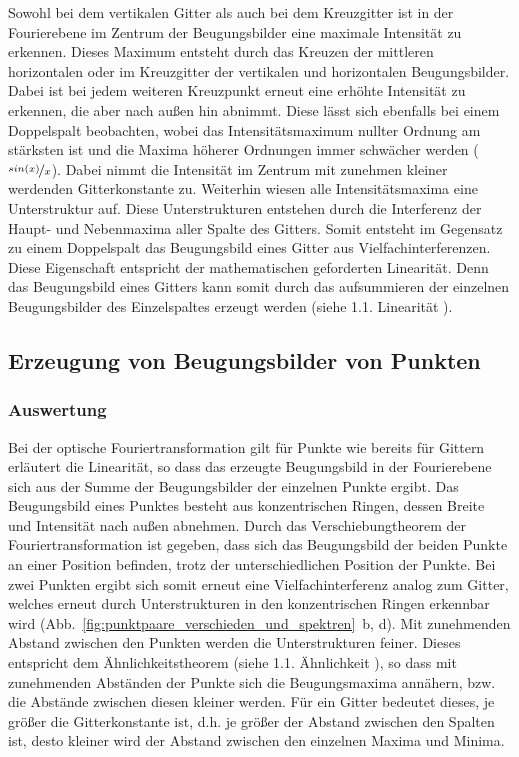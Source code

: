 Sowohl bei dem vertikalen Gitter als auch bei dem Kreuzgitter ist in der Fourierebene im Zentrum der Beugungsbilder eine maximale Intensität zu erkennen. Dieses Maximum entsteht durch das Kreuzen der mittleren horizontalen oder im Kreuzgitter der vertikalen und
horizontalen Beugungsbilder. Dabei ist bei jedem weiteren Kreuzpunkt erneut eine erhöhte Intensität zu erkennen, die aber nach außen hin abnimmt. Diese lässt sich ebenfalls bei einem
Doppelspalt beobachten, wobei das Intensitätsmaximum nullter Ordnung am stärksten ist und die Maxima höherer Ordnungen immer schwächer werden ($\nicefrac{sin(x)}{x}$). Dabei nimmt die Intensität im Zentrum mit zunehmen kleiner werdenden Gitterkonstante zu.
Weiterhin wiesen alle Intensitätsmaxima eine Unterstruktur auf. Diese Unterstrukturen entstehen durch die Interferenz der Haupt- und Nebenmaxima aller Spalte des Gitters. Somit entsteht im Gegensatz zu einem Doppelspalt das Beugungsbild eines Gitter aus Vielfachinterferenzen. Diese Eigenschaft entspricht der mathematischen geforderten Linearität. Denn das Beugungsbild eines Gitters kann somit durch das aufsummieren der einzelnen Beugungsbilder des Einzelspaltes erzeugt werden (siehe 1.1. Linearität%
).


\subsection{Erzeugung von Beugungsbilder von Punkten}
\subsubsection*{Auswertung}

Bei der optische Fouriertransformation gilt für Punkte wie bereits für Gittern erläutert die Linearität, so dass das erzeugte Beugungsbild in der Fourierebene sich aus der Summe der Beugungsbilder der einzelnen Punkte ergibt. Das Beugungsbild eines Punktes besteht aus konzentrischen Ringen, dessen Breite und Intensität nach außen abnehmen. Durch das Verschiebungtheorem der Fouriertransformation ist gegeben, dass sich das Beugungsbild der beiden Punkte an einer Position befinden, trotz der unterschiedlichen Position der Punkte. Bei zwei Punkten ergibt sich somit erneut eine Vielfachinterferenz analog zum Gitter, welches erneut durch Unterstrukturen in den konzentrischen Ringen erkennbar wird (Abb.~\ref{fig:punktpaare_verschieden_und_spektren}~b, d). Mit zunehmenden Abstand zwischen den Punkten werden die Unterstrukturen feiner. Dieses entspricht dem Ähnlichkeitstheorem (siehe 1.1. Ähnlichkeit%
), so dass mit zunehmenden Abständen der Punkte sich die Beugungsmaxima annähern, bzw. die Abstände zwischen diesen kleiner werden. Für ein Gitter bedeutet dieses, je größer die Gitterkonstante ist, d.h. je größer der Abstand zwischen den Spalten ist, desto kleiner wird der Abstand zwischen den einzelnen Maxima und Minima.

